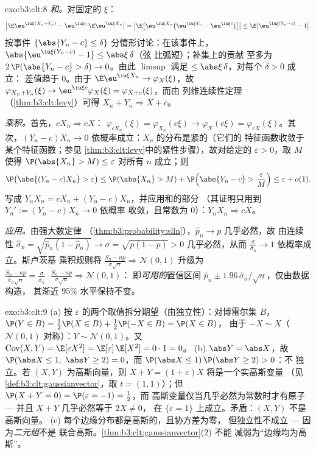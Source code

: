 \begin{solution}{exo:b3:clt:8}
\emph{和。}对固定的 $\xi$：
\[
\bigl|\E\eu^{\iu\xi(X_n+Y_n)} -
\eu^{\iu\xi c}\,\E\eu^{\iu\xi X_n}\bigr|
= \bigl|\E\bigl[\eu^{\iu\xi X_n}\bigl(\eu^{\iu\xi Y_n} -
\eu^{\iu\xi c}\bigr)\bigr]\bigr|
\leq \E\bigl|\eu^{\iu\xi(Y_n - c)} - 1\bigr| .
\]
按事件 $\{\abs{Y_n - c} \leq \delta\}$ 分情形讨论：在该事件上，
$\abs{\eu^{\iu\xi(Y_n-c)} - 1} \leq \abs\xi\,\delta$（弦
比弧短）；补集上的贡献
至多为 $2\,\P(\abs{Y_n - c} > \delta) \to 0$。由此
$\limsup$ 满足 $\leq \abs\xi\,\delta$，对每个 $\delta > 0$ 成立：
差值趋于 $0$。由于 $\E\eu^{\iu\xi X_n} \to
\varphi_X(\xi)$，故 $\varphi_{X_n+Y_n}(\xi) \to
\eu^{\iu\xi c}\varphi_X(\xi) = \varphi_{X+c}(\xi)$，而由
列维连续性定理（\cref{thm:b3:clt:levy}）可得 $X_n + Y_n
\Rightarrow X + c$。

\emph{乘积。}首先，$cX_n \Rightarrow cX$：
$\varphi_{cX_n}(\xi) = \varphi_{X_n}(c\xi) \to
\varphi_X(c\xi) = \varphi_{cX}(\xi)$。其次，$(Y_n - c)X_n
\to 0$ 依概率成立：$X_n$ 的分布是紧的（它们的
特征函数收敛于某个特征函数；参见
\cref{thm:b3:clt:levy}中的紧性步骤），故对给定的 $\varepsilon > 0$，取 $M$
使得 $\P(\abs{X_n} > M) \leq \varepsilon$ 对所有 $n$ 成立；则
\[
\P\bigl(\abs{(Y_n - c)X_n} > \varepsilon\bigr) \leq
\P(\abs{X_n} > M) + \P\Bigl(\abs{Y_n - c} >
\frac{\varepsilon}{M}\Bigr) \leq \varepsilon + o(1) .
\]
写成 $Y_nX_n = cX_n + (Y_n - c)X_n$，并应用和的部分
（其证明只用到 $Y_n' := (Y_n - c)X_n \to 0$ 依概率
收敛，且常数为 $0$）：$Y_nX_n \Rightarrow cX$。

\emph{应用。}由强大数定律
（\cref{thm:b3:probability:slln}），$\hat p_n \to p$ 几乎必然，故
由连续性 $\hat\sigma_n = \sqrt{\hat p_n(1 - \hat p_n)}
\to \sigma = \sqrt{p(1 - p)} > 0$ 几乎必然，从而
$\frac{\sigma}{\hat\sigma_n} \to 1$ 依概率成立。斯卢茨基
乘积规则将 $\frac{S_n - np}{\sigma\sqrt n}
\Rightarrow \mathcal N(0,1)$ 升级为 $\frac{S_n -
np}{\hat\sigma_n\sqrt n} = \frac{\sigma}{\hat\sigma_n}\cdot
\frac{S_n - np}{\sigma\sqrt n} \Rightarrow \mathcal N(0,1)$：
即\emph{可用的}置信区间 $\hat p_n \pm
1.96\,\hat\sigma_n/\sqrt n$，仅由数据构造，
其渐近 $95\%$ 水平保持不变。
\end{solution}

\begin{solution}{exo:b3:clt:9}
(a) 按
$\varepsilon$ 的两个取值拆分期望（由独立性）：对博雷尔集 $B$，$\P(Y \in B) =
\frac12\P(X \in B) + \frac12\P(-X \in B) = \P(X \in B)$，
由于 $-X \sim X$（$\mathcal N(0,1)$ 对称）：$Y \sim
\mathcal N(0,1)$。又 $\operatorname{Cov}(X, Y) =
\E[\varepsilon X^2] = \E[\varepsilon]\,\E[X^2] = 0 \cdot 1 =
0$。
(b) $\abs Y = \abs X$，故 $\P(\abs X \leq 1,\ \abs Y \geq 2)
= 0$，而 $\P(\abs X \leq 1)\,\P(\abs Y \geq 2) > 0$：不
独立。若 $(X, Y)$ 为高斯向量，则 $X + Y =
(1 + \varepsilon)X$ 将是一个实高斯变量
（见\cref{def:b3:clt:gaussianvector}，取 $t = (1,1)$）；但
$\P(X + Y = 0) = \P(\varepsilon = -1) = \frac12$，而
高斯变量仅当几乎必然为常数时才有原子
--- 并且 $X + Y$ 几乎必然等于 $2X \neq 0$，
在 $\{\varepsilon = 1\}$ 上成立。矛盾：$(X, Y)$ 不是
高斯向量。
(c) 每个边缘分布都是高斯的，且协方差为零，
但独立性不成立 --- 因为\emph{二元组}不是
联合高斯。\cref{thm:b3:clt:gaussianvector}(2) 不能
减弱为“边缘均为高斯”。
\end{solution}

